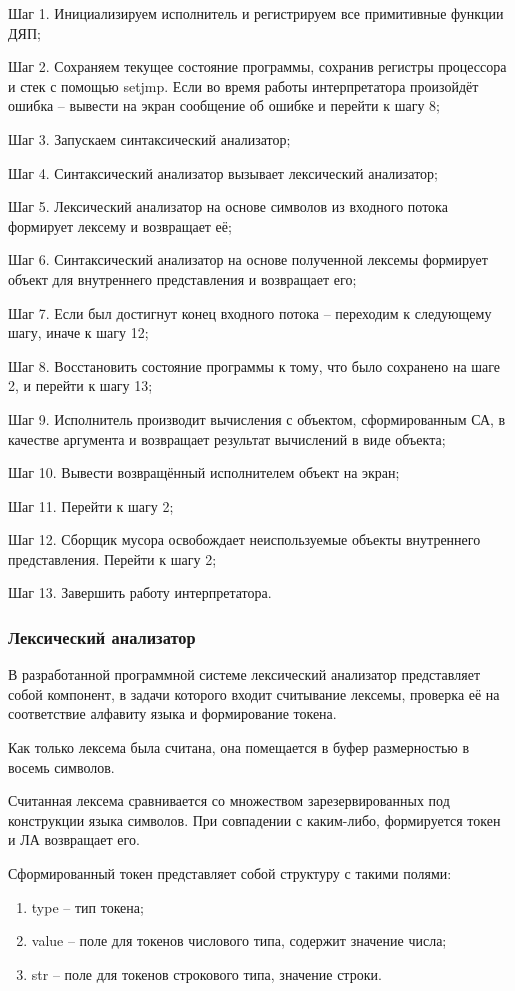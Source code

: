 Шаг 1. Инициализируем исполнитель и регистрируем все примитивные функции ДЯП;

Шаг 2. Сохраняем текущее состояние программы, сохранив регистры процессора и стек с помощью setjmp. Если во время работы интерпретатора произойдёт ошибка -- вывести на экран сообщение об ошибке и перейти к шагу 8;

Шаг 3. Запускаем синтаксический анализатор;

Шаг 4. Синтаксический анализатор вызывает лексический анализатор;

Шаг 5. Лексический анализатор на основе символов из входного потока формирует лексему и возвращает её;

Шаг 6. Синтаксический анализатор на основе полученной лексемы формирует объект для внутреннего представления и возвращает его;

Шаг 7. Если был достигнут конец входного потока -- переходим к следующему шагу, иначе к шагу 12;

Шаг 8. Восстановить состояние программы к тому, что было сохранено на шаге 2, и перейти к шагу 13;

Шаг 9. Исполнитель производит вычисления с объектом, сформированным СА, в качестве аргумента и возвращает результат вычислений в виде объекта;

Шаг 10. Вывести возвращённый исполнителем объект на экран;

Шаг 11. Перейти к шагу 2;

Шаг 12. Сборщик мусора освобождает неиспользуемые объекты внутреннего представления. Перейти к шагу 2;

Шаг 13. Завершить работу интерпретатора.

\subsubsection{Лексический анализатор}
В разработанной программной системе лексический анализатор представляет собой компонент, в задачи которого входит считывание лексемы, проверка её на соответствие алфавиту языка и формирование токена.

Как только лексема была считана, она помещается в буфер размерностью в восемь символов.

Считанная лексема сравнивается со множеством зарезервированных под конструкции языка символов. При совпадении с каким-либо, формируется токен и ЛА возвращает его.


Сформированный токен представляет собой структуру с такими полями:
\begin{enumerate}
	\item type -- тип токена;
	\item value -- поле для токенов числового типа, содержит значение числа;
	\item str -- поле для токенов строкового типа, значение строки.
\end{enumerate}

